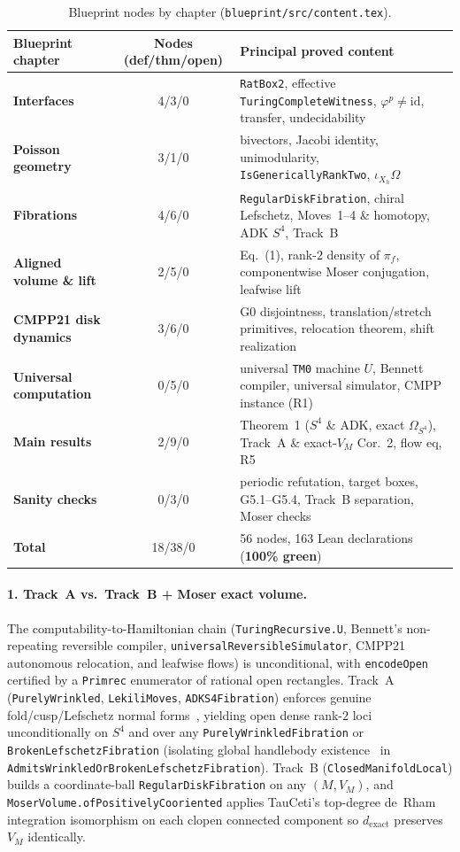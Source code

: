 \documentclass[10pt]{article}
\renewcommand{\_}{\origus\allowbreak}
\newcommand{\code}[1]{\texttt{#1}}
\newcommand{\NTotalNodes}{56}
\newcommand{\NLeanDecls}{163}
\begin{document}
\begin{table}[!ht]
\centering\footnotesize
\renewcommand{\arraystretch}{1.08}
\begin{tabularx}{\textwidth}{@{}>{\bfseries}l c X@{}}
\toprule
Blueprint chapter & Nodes (def/thm/open) & Principal proved content \\
\midrule
Interfaces & 4/3/0 & \code{RatBox2}, effective \code{TuringCompleteWitness}, $\varphi^p\neq\mathrm{id}$, transfer, undecidability \\
Poisson geometry & 3/1/0 & bivectors, Jacobi identity, unimodularity, \code{IsGenericallyRankTwo}, $\iota_{X_h}\Omega$ \\
Fibrations & 4/6/0 & \code{RegularDiskFibration}, chiral Lefschetz, Moves~1--4 \& homotopy, ADK $S^4$, Track~B \\
Aligned volume \& lift & 2/5/0 & Eq.~(1), rank-$2$ density of $\pi_f$, componentwise Moser conjugation, leafwise lift \\
CMPP21 disk dynamics & 3/6/0 & G0 disjointness, translation/stretch primitives, relocation theorem, shift realization \\
Universal computation & 0/5/0 & universal \code{TM0} machine $U$, Bennett compiler, universal simulator, CMPP instance (R1) \\
Main results & 2/9/0 & Theorem~1 ($S^4$ \& ADK, exact $\Omega_{S^4}$), Track~A \& exact-$V_M$ Cor.~2, flow eq, R5 \\
Sanity checks & 0/3/0 & periodic refutation, target boxes, G5.1--G5.4, Track~B separation, Moser checks \\
\midrule
Total & 18/38/0 & \NTotalNodes{} nodes, \NLeanDecls{} Lean declarations (\textbf{100\% green}) \\
\bottomrule
\end{tabularx}
\caption{Blueprint nodes by chapter (\code{blueprint/src/content.tex}).}
\label{tab:layers}
\end{table}

\paragraph{1. Track~A vs.\ Track~B + Moser exact volume.}\sloppy
The computability-to-Hamiltonian chain (\code{TuringRecursive.U}, Bennett's non-repeating reversible
compiler, \code{universalReversibleSimulator}, CMPP21 autonomous relocation, and leafwise flows) is
unconditional, with \code{encodeOpen} certified by a \code{Primrec} enumerator of rational open
rectangles. Track~A (\code{PurelyWrinkled}, \code{LekiliMoves}, \code{ADKS4Fibration}) enforces
genuine fold/cusp/Lefschetz normal forms~\cite{GSV15,ST16,Lek09}, yielding open dense rank-$2$ loci
unconditionally on $S^4$ and over any \code{PurelyWrinkledFibration} or
\code{BrokenLefschetzFibration} (isolating global handlebody existence~\cite{GK07} in
\code{AdmitsWrinkledOrBroken\allowbreak LefschetzFibration}). Track~B (\code{ClosedManifoldLocal})
builds a coordinate-ball \code{RegularDiskFibration} on any $(M,V_M)$, and
\code{MoserVolume.ofPositivelyCooriented} applies TauCeti's top-degree de~Rham integration
isomorphism on each clopen connected component so $d_{\mathrm{exact}}$ preserves $V_M$ identically.
\end{document}
